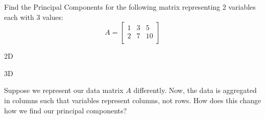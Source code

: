 \begin{enumerate}
	\qitem Find the Principal Components for the following matrix representing 2 variables each with 3 values: $$A = \begin{bmatrix}
    1 & 3 & 5 \\
    2 & 7 & 10 \\
  \end{bmatrix}$$
	\sol {

	}

	\qitem 2D
	\sol {

	}

	\qitem 3D
	\sol {


	}

	\qitem Suppose we represent our data matrix $A$ differently. Now, the data is aggregated in columns such that variables represent columns, not rows. How does this change how we find our principal components?
	\sol {

	}

\end{enumerate}